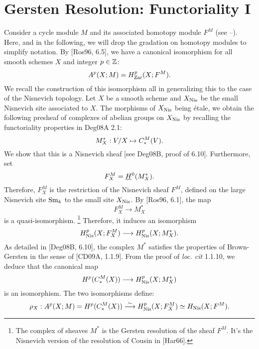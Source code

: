 \section{Gersten Resolution: Functoriality I}

Consider a cycle module $M$ and its associated homotopy module 
$F^M$ (see --). Here, and in the following, we will drop the 
gradation on homotopy modules to simplify notation. By 
[Ros96, 6.5], we have a canonical isomorphism for all smooth 
schemes $X$ and integer $p \in \mathbb{Z}$:
\[
A^p(X; M) = H_{\mathrm{Zar}}^p(X; F^M).
\]
We recall the construction of this isomorphism all in generalizing
this to the case of the Nisnevich topology. Let $X$ be a smooth 
scheme and $X_{\mathrm{Nis}}$ be the small Nisnevich site associated to 
$X$. The morphisms of $X_{\mathrm{Nis}}$ being \'etale, we obtain the 
following presheaf of complexes of abelian groups on $X_{\mathrm{Nis}}$ 
by recalling the functoriality properties in Deg08A 2.1:
\[
M^*_X: V/X \mapsto C_*^{M}(V).
\]
We show that this is a Nisnevich sheaf [see Deg08B, proof of 6.10].
Furthermore, set
\[
F^M_X = \underline{H}^0(M^*_X).
\]
Therefore, $F^M_X$ is the restriction of the Nisnevich sheaf $F^M$,
defined on the large Nisnevich site $\mathrm{Sm}_{k}$ to the small site
$X_{\mathrm{Nis}}$. By [Ros96, 6.1], the map
\[
F^M_X \to M^*_X
\]
is a quasi-isomorphism. \footnote{The complex of sheaves $M^*$ is 
the Gersten resolution of the sheaf $F^M$. It's the Nisnevich 
version of the resolution of Cousin in [Har66].} Therefore, it 
induces an isomorphism
\[
H_{\mathrm{Nis}}^p(X; F^M_X) \longrightarrow H_{\mathrm{Nis}}^p(X; M^*_X).
\]
As detailed in [Deg08B, 6.10], the complex $M^*$ satisfies the
properties of Brown-Gersten in the sense of [CD09A, 1.1.9]. From 
the proof of \emph{loc. cit} 1.1.10, we deduce that the canonical
map
\[
H^p(C_*^{M}(X)) \longrightarrow H_{\mathrm{Nis}}^p(X; M^*_X)
\]
is an isomorphism. The two isomorphisms define:
\begin{equation}\label{eq_cm_hnis_equiv}
\rho_X: A^p(X; M) = H^p(C_*^{M}(X)) \stackrel{\sim}{\longrightarrow}
   H_{\mathrm{Nis}}^p(X; F^M_X) \simeq H_{\mathrm{Nis}}(X; F^M).
\end{equation}

